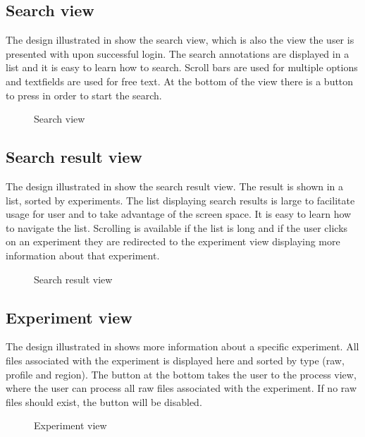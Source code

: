 \subsection{Search view}
The design illustrated in  show the search view, 
which is also the view the user is presented with upon successful login.
The search annotations are displayed in a list and it is easy to learn how to search.
Scroll bars are used for multiple options and textfields are used for free text. 
At the bottom of the view there is a button to press in order to start the search.

\begin{figure}[ht]
\caption{\footnotesize Search view}
\label{fig:and_search}
\end{figure}
\FloatBarrier

\subsection{Search result view}
The design illustrated in  show the search result view. 
The result is shown in a list, sorted by experiments. The list displaying search results is large to facilitate usage for user and to take advantage of the screen space. 
It is easy to learn how to navigate the list. 
Scrolling is available if the list is long and if the user clicks on an experiment they are redirected to the experiment view displaying more information about that experiment.

\begin{figure}[ht]
\caption{\footnotesize Search result view}
\label{fig:and_result}
\end{figure}
\FloatBarrier

\subsection{Experiment view}
The design illustrated in  shows more information about a specific experiment. 
All files associated with the experiment is displayed here and sorted by type (raw, profile and region).
The button  at the bottom takes the user to the process view, where the user can process all raw files associated with the experiment.
If no raw files should exist, the button will be disabled.

\begin{figure}[ht]
\caption{\footnotesize Experiment view}
\label{fig:and_experiment}
\end{figure}
\FloatBarrier


